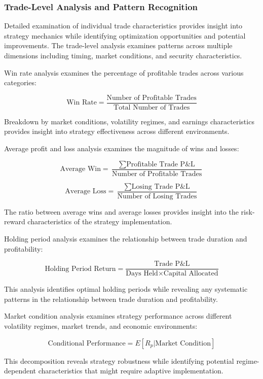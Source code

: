 \documentclass[
  american,
  11pt,
  11pt,
  letterpaper,
  onecolumn]{article}
\begin{document}
\subsubsection{Trade-Level Analysis and Pattern
Recognition}\label{trade-level-analysis-and-pattern-recognition}

Detailed examination of individual trade characteristics provides
insight into strategy mechanics while identifying optimization
opportunities and potential improvements. The trade-level analysis
examines patterns across multiple dimensions including timing, market
conditions, and security characteristics.

Win rate analysis examines the percentage of profitable trades across
various categories:

\[\text{Win Rate} = \frac{\text{Number of Profitable Trades}}{\text{Total Number of Trades}}\]

Breakdown by market conditions, volatility regimes, and earnings
characteristics provides insight into strategy effectiveness across
different environments.

Average profit and loss analysis examines the magnitude of wins and
losses:

\[\text{Average Win} = \frac{\sum \text{Profitable Trade P\&L}}{\text{Number of Profitable Trades}}\]

\[\text{Average Loss} = \frac{\sum \text{Losing Trade P\&L}}{\text{Number of Losing Trades}}\]

The ratio between average wins and average losses provides insight into
the risk-reward characteristics of the strategy implementation.

Holding period analysis examines the relationship between trade duration
and profitability:

\[\text{Holding Period Return} = \frac{\text{Trade P\&L}}{\text{Days Held} \times \text{Capital Allocated}}\]

This analysis identifies optimal holding periods while revealing any
systematic patterns in the relationship between trade duration and
profitability.

Market condition analysis examines strategy performance across different
volatility regimes, market trends, and economic environments:

\[\text{Conditional Performance} = E[R_p | \text{Market Condition}]\]

This decomposition reveals strategy robustness while identifying
potential regime-dependent characteristics that might require adaptive
implementation.
\end{document}
